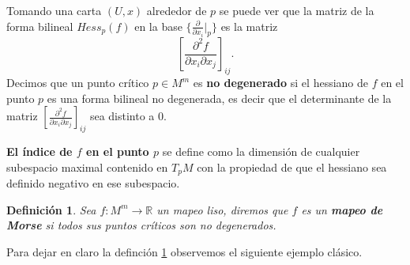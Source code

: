 \documentclass[a4paper,10pt]{book}
\newtheorem{definicion}{Definici\'on}[chapter]
\begin{document}
Tomando una carta $(U,x)$ alrededor de $p$ se puede ver que la matriz de la forma bilineal $Hess_{p}(f)$ en la base $\{ \frac{\partial }{\partial x_{i}}|_{p} \}$ es la matriz 
$$\left[ \frac{\partial^{2}f}{\partial x_{i}\partial x_{j}}\right]_{ij}.$$
Decimos que un punto cr\'itico $p\in M^{m}$ es {\bfseries no degenerado} si el hessiano de $f$ en el punto $p$ es una forma bilineal no degenerada, es decir que el determinante de la matriz $\left[ \frac{\partial^{2}f}{\partial x_{i}\partial x_{j}}\right]_{ij}$ sea distinto a $0$.
\vspace{5mm}

{\bfseries El \'indice de $f$ en el punto $p$} se define como la dimensi\'on de cualquier subespacio maximal contenido en $T_{p}M$ con la propiedad de que el hessiano sea definido negativo en ese subespacio.

\begin{definicion}\label{DefMor}
Sea $f:M^{m}\to\mathbb{R}$ un mapeo liso, diremos que $f$ es un {\bfseries mapeo de Morse} si todos sus puntos cr\'iticos son no degenerados. 
\end{definicion}

Para dejar en claro la definci\'on \ref{DefMor} observemos el siguiente ejemplo cl\'asico.
\end{document}
